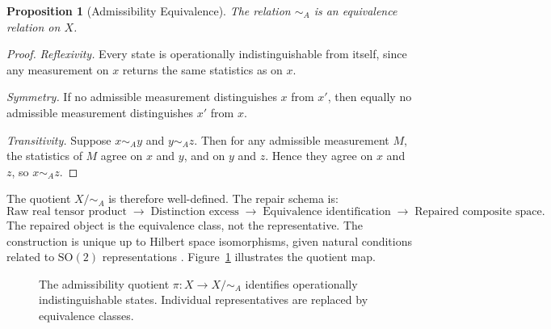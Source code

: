 \documentclass[12pt]{article}
\newtheorem{proposition}[theorem]{Proposition}
\begin{document}
\begin{proposition}[Admissibility Equivalence]
\label{prop:equiv-rel}
The relation $\sim_A$ is an equivalence relation on $X$.
\end{proposition}

\begin{proof}
\emph{Reflexivity.} Every state is operationally indistinguishable from itself, since any measurement on $x$ returns the same statistics as on $x$.

\emph{Symmetry.} If no admissible measurement distinguishes $x$ from $x'$, then equally no admissible measurement distinguishes $x'$ from $x$.

\emph{Transitivity.} Suppose $x \sim_A y$ and $y \sim_A z$. Then for any admissible measurement $M$, the statistics of $M$ agree on $x$ and $y$, and on $y$ and $z$. Hence they agree on $x$ and $z$, so $x \sim_A z$.
\end{proof}

The quotient $X/{\sim_A}$ is therefore well-defined. The repair schema is:
\[
\text{Raw real tensor product}
\;\longrightarrow\;
\text{Distinction excess}
\;\longrightarrow\;
\text{Equivalence identification}
\;\longrightarrow\;
\text{Repaired composite space.}
\]
The repaired object is the equivalence class, not the representative. The construction is unique up to Hilbert space isomorphisms, given natural conditions related to $\mathrm{SO}(2)$ representations \cite{Barrios}. Figure~\ref{fig:quotient} illustrates the quotient map.

\begin{figure}[ht]
\centering
{}
\caption{The admissibility quotient $\pi\colon X \to X/{\sim_A}$ identifies
operationally indistinguishable states. Individual representatives are replaced
by equivalence classes.}
\label{fig:quotient}
\end{figure}

\end{document}
